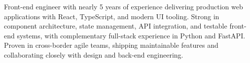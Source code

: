 

\begin{cvparagraph}

Front-end engineer with nearly 5 years of experience delivering production web applications with React, TypeScript, and modern UI tooling. Strong in component architecture, state management, API integration, and testable front-end systems, with complementary full-stack experience in Python and FastAPI. Proven in cross-border agile teams, shipping maintainable features and collaborating closely with design and back-end engineering.
\end{cvparagraph}
